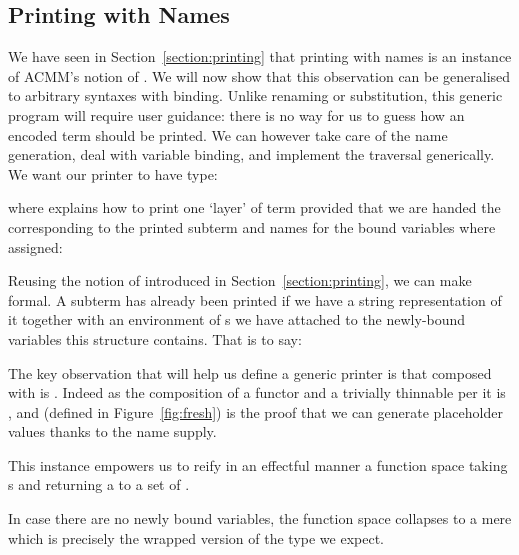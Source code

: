 
\subsection{Printing with Names}\label{section:genericprinting}

We have seen in Section~\ref{section:printing} that printing with names
is an instance of ACMM's notion of \semrec{}. We will now show that this
observation can be generalised to arbitrary syntaxes with binding. Unlike
renaming or substitution, this generic program will require user guidance:
there is no way for us to guess how an encoded term should be printed. We
can however take care of the name generation, deal with variable binding,
and implement the traversal generically. We want our printer to have type:


where  explains how to print one `layer' of term provided that
we are handed the  corresponding to the printed subterm and
names for the bound variables where assigned:


Reusing the notion of  introduced in Section~\ref{section:printing},
we can make  formal. A subterm has already been printed if we
have a string representation of it together with an environment of s
we have attached to the newly-bound variables this structure contains.
That is to say:


The key observation that will help us define a generic printer is that
 composed with  is . Indeed as the composition
of a functor and a trivially thinnable per it is ,
and  (defined in Figure~\ref{fig:fresh}) is the proof that we
can generate placeholder values thanks to the name supply.


This  instance empowers us to reify in an effectful manner
a  function space taking s and returning a 
to a set of .


In case there are no newly bound variables, the  function space
collapses to a mere  which is precisely the wrapped version of
the type we expect.

